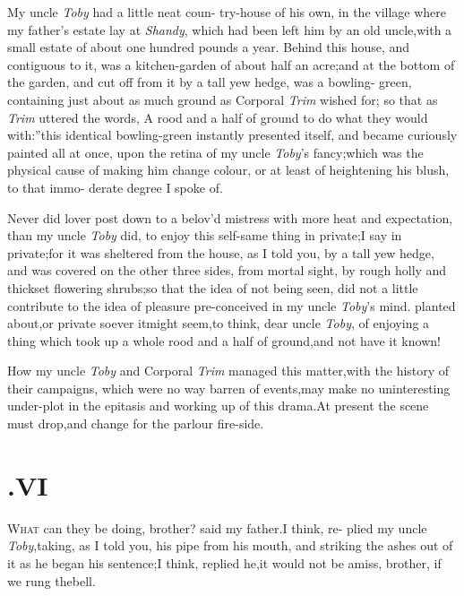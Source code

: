 \documentclass{article}
\begin{document}
My uncle \textit{Toby} had a little neat coun-\break
try-house of his own, in the village where my father’s estate lay at \textit{Shandy},
which had been left him by an old uncle,\break with a small estate of
about one hundred pounds a year. Behind this house, and contiguous
to it, was a kitchen-garden of about half an acre;\tsk and at the
bottom of the garden, and cut off from it\break
by a tall yew hedge, was a bowling-\break 
green, containing just about as much
ground as Corporal
\textit{Trim} wished for;\tsk\break
so that as \textit{Trim} uttered the
words, \lqq A rood and a half of ground to do what\break
they would with:”\tsh this identical bowling-green instantly presented
itself, and became curiously painted all at once, upon the retina
of my uncle \textit{Toby}’s fancy;\break\tsh which was the physical
cause of making him change colour, or at least of heightening his
blush, to that immo-\break
derate degree I spoke of.

Never did lover post down to a belov’d mistress with more heat
and expectation, than my uncle \textit{Toby} did, to enjoy this
self-same thing in private;\tsk I say in private;\tsk for it was sheltered from the house, as
I told you, by a tall yew hedge, and was covered on the other three
sides, from mortal sight, by rough holly and thickset flowering
shrubs;\tsk so that the
idea of not being seen, did not a little contribute to the
idea of pleasure pre-conceived in my uncle \textit{Toby}’s
mind.\tsk\break 
{}
planted about,\tsh or private soever it\break might seem,\tsk to think,
dear uncle \textit{Toby}, of enjoying a thing which took up
a whole rood and a half of ground,\tsk and\break
not have it known!

How my uncle \textit{Toby} and Corporal \textit{Trim} managed this
matter,\tsk with the history of their campaigns, which were no
way barren of events,\tsh may make no uninteresting
under-plot in the epitasis and working up of this drama.\tsk At
present the scene must drop,\tsk and change for the parlour
fire-side.

\bigskip
{}
\newpage
\section{.\enspace  VI}

\quad\tsh \textsc{What} can they be doing,\break
brother? said my father.\tsk I think, re-\break
plied my uncle \textit{Toby},\tsk taking, as I told you,
his pipe from his mouth, and striking the ashes out of it as he
began his sentence;\tsh I think, replied he,\tsk it
would not be amiss, brother, if we rung the\break bell.
\end{document}
